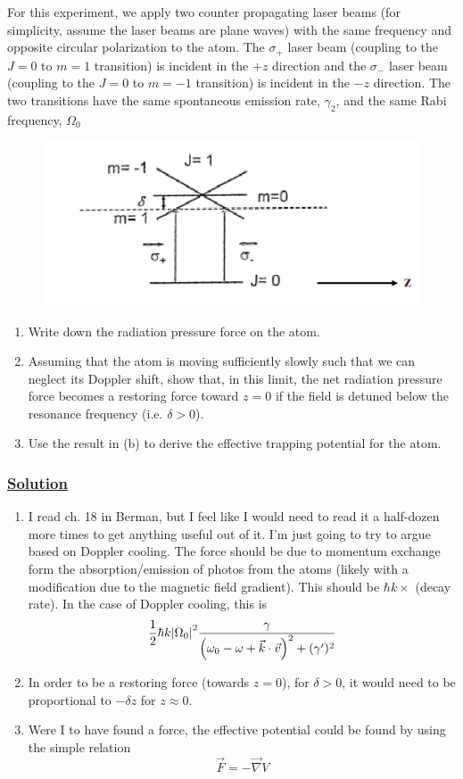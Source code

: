 \documentclass[12pt]{article}
\begin{document}
For this experiment, we apply two counter propagating laser beams (for simplicity, assume the laser beams are plane waves) with the same frequency and opposite circular polarization to the atom.
The $\sigma_+$ laser beam (coupling to the $J=0$ to $m=1$ transition) is incident in the $+z$ direction and the $\sigma_-$ laser beam (coupling to the $J=0$ to $m=-1$ transition) is incident in the $-z$ direction.
The two transitions have the same spontaneous emission rate, $\gamma_2$, and the same Rabi frequency, $\Omega_0$
\begin{figure}[h]
    \centering
    \includegraphics[scale=.75]{polarized_beams.png}
\end{figure}
\begin{enumerate}[label=(\alph*)]
    \item Write down the radiation pressure force on the atom.
    \item Assuming that the atom is moving sufficiently slowly such that we can neglect its Doppler shift, show that, in this limit, the net radiation pressure force becomes a restoring force toward $z=0$ if the field is detuned below the resonance frequency (i.e. $\delta>0$).
    \item Use the result in (b) to derive the effective trapping potential for the atom.
\end{enumerate}

\subsubsection*{\underline{Solution}}
\begin{enumerate}[label=(\alph*)]
    \item I read ch. 18 in Berman, but I feel like I would need to read it a half-dozen more times to get anything useful out of it.
    I'm just going to try to argue based on Doppler cooling.
    The force should be due to momentum exchange form the absorption/emission of photos from the atoms (likely with a modification due to the magnetic field gradient).
    This should be $\hbar k \times$ (decay rate). In the case of Doppler cooling, this is
    \[ \frac{1}{2}\hbar k \abs{\Omega_0}^2 \frac{\gamma}{\left(\omega_0 - \omega + \vec{k}\cdot\vec{v}\right)^2 + (\gamma')^2} \]
    \item In order to be a restoring force (towards $z=0$), for $\delta > 0$, it would need to be proportional to $-\delta z$ for $z \approx 0$.
    \item Were I to have found a force, the effective potential could be found by using the simple relation \[ \vec{F} = -\vec{\nabla}V \]
\end{enumerate}

%
\end{document}
